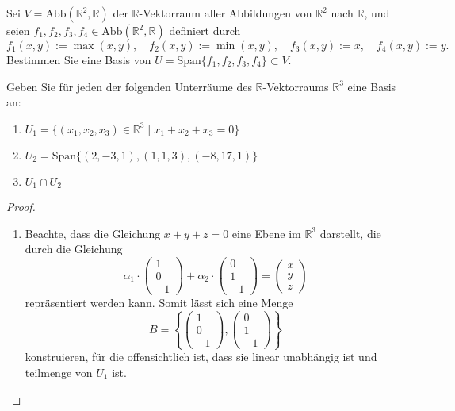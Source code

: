 \documentclass{../problemset}
\begin{document}
\begin{problem}
Sei $V = \text{Abb}(\mathbb{R}^2, \mathbb{R})$ der $\mathbb{R}$-Vektorraum aller Abbildungen von $\mathbb{R}^2$ nach $\mathbb{R}$, und seien $f_1, f_2, f_3, f_4 \in \text{Abb}(\mathbb{R}^2, \mathbb{R})$ definiert durch
\[ f_1(x, y) := \max(x, y), \quad f_2(x, y) := \min(x, y), \quad f_3(x, y) := x, \quad f_4(x, y) := y. \]
Bestimmen Sie eine Basis von $U = \text{Span}\{f_1, f_2, f_3, f_4\} \subset V$.
\end{problem}

\pagebreak

\begin{problem}
Geben Sie für jeden der folgenden Unterräume des $\mathbb{R}$-Vektorraums $\mathbb{R}^3$ eine Basis an:
\begin{enumerate}
	\item $U_1 = \{(x_1, x_2, x_3) \in \mathbb{R}^3 \mid x_1 + x_2 + x_3 = 0\}$
	\item $U_2 = \text{Span}\{(2, -3, 1), (1, 1, 3), (-8, 17, 1)\}$
	\item $U_1 \cap U_2$
\end{enumerate}
\begin{proof}
	$ $

	\begin{enumerate}
		\item Beachte, dass die Gleichung $x + y + z = 0$ eine Ebene im $\mathbb{R}^3$ darstellt, die durch die Gleichung
		      \[
			      \alpha_1 \cdot \begin{pmatrix}
				      1 \\
				      0 \\
				      -1
			      \end{pmatrix} + \alpha_2 \cdot \begin{pmatrix}
				      0 \\
				      1 \\
				      -1
			      \end{pmatrix} = \begin{pmatrix}
				      x \\
				      y \\
				      z
			      \end{pmatrix}
		      \]
		      repräsentiert werden kann. Somit lässt sich eine Menge
		      \[
			      B = \left\{\begin{pmatrix}
				      1 \\
				      0 \\
				      -1
			      \end{pmatrix}, \begin{pmatrix}
				      0 \\
				      1 \\
				      -1
			      \end{pmatrix}\right\}
		      \]
		      konstruieren, für die offensichtlich ist, dass sie linear unabhängig ist und teilmenge von $U_1$ ist.


\end{enumerate}
\end{proof}
\end{problem}
\end{document}

